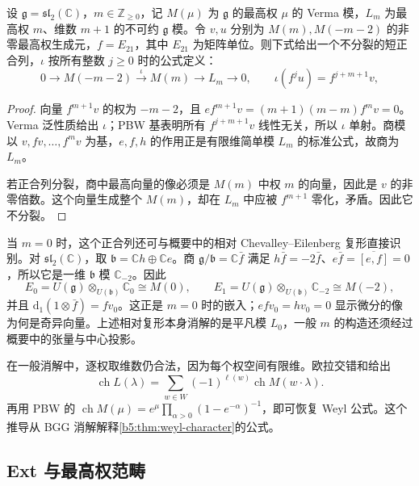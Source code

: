 \begin{proposition}\label{b5:prop:bgg-sl2-explicit}
	设 \(\mathfrak g=\mathfrak{sl}_2(\mathbb C)\)，\(m\in\mathbb Z_{\ge0}\)，记 \(M(\mu)\) 为 \(\mathfrak g\) 的最高权 \(\mu\) 的 Verma 模，\(L_m\) 为最高权 \(m\)、维数 \(m+1\) 的不可约 \(\mathfrak g\) 模。令 \(v,u\) 分别为 \(M(m),M(-m-2)\) 的非零最高权生成元，\(f=E_{21}\)，其中 \(E_{21}\) 为矩阵单位。则下式给出一个不分裂的短正合列，\(\iota\) 按所有整数 \(j\ge0\) 时的公式定义：
	\[
		0\longrightarrow M(-m-2)\overset{\iota}{\longrightarrow} M(m)\longrightarrow L_m\longrightarrow0, \qquad \iota(f^ju)=f^{j+m+1}v,
	\]
\end{proposition}
\begin{proof}
	向量 \(f^{m+1}v\) 的权为 \(-m-2\)，且 \(ef^{m+1}v=(m+1)(m-m)f^mv=0\)。Verma 泛性质给出 \(\iota\)；PBW 基表明所有 \(f^{j+m+1}v\) 线性无关，所以 \(\iota\) 单射。商模以 \(v,fv,\ldots,f^mv\) 为基，\(e,f,h\) 的作用正是有限维简单模 \(L_m\) 的标准公式，故商为 \(L_m\)。

	若正合列分裂，商中最高向量的像必须是 \(M(m)\) 中权 \(m\) 的向量，因此是 \(v\) 的非零倍数。这个向量生成整个 \(M(m)\)，却在 \(L_m\) 中应被 \(f^{m+1}\) 零化，矛盾。因此它不分裂。
\end{proof}

当 \(m=0\) 时，这个正合列还可与概要中的相对 Chevalley--Eilenberg 复形直接识别。对 \(\mathfrak{sl}_2(\mathbb C)\)，取 \(\mathfrak b=\mathbb Ch\oplus\mathbb Ce\)。商 \(\mathfrak g/\mathfrak b=\mathbb C\bar f\) 满足 \(h\bar f=-2\bar f\)、\(e\bar f=\overline{[e,f]}=0\)，所以它是一维 \(\mathfrak b\) 模 \(\mathbb C_{-2}\)。因此
\[
	E_0=U(\mathfrak g)\otimes_{U(\mathfrak b)}\mathbb C_0\cong M(0), \qquad E_1=U(\mathfrak g)\otimes_{U(\mathfrak b)}\mathbb C_{-2}\cong M(-2),
\]
并且 \(\mathrm{d}_1(1\otimes\bar f)=fv_0\)。这正是 \(m=0\) 时的嵌入；\(efv_0=hv_0=0\) 显示微分的像为何是奇异向量。上述相对复形本身消解的是平凡模 \(L_0\)，一般 \(m\) 的构造还须经过概要中的张量与中心投影。

\ProseParagraphBreak

在一般消解中，逐权取维数仍合法，因为每个权空间有限维。欧拉交错和给出
\[
	\operatorname{ch}L(\lambda) =\sum_{w\in W}(-1)^{\ell(w)}\operatorname{ch}M(w\mathbin{\cdot}\lambda).
\]
再用 PBW 的 \(\operatorname{ch}M(\mu)=e^\mu\prod_{\alpha>0}(1-e^{-\alpha})^{-1}\)，即可恢复 Weyl 公式。这个推导从 BGG 消解解释\cref{b5:thm:weyl-character}的公式。

\subsection{Ext 与最高权范畴}
\label{b5:subsec:2004:02}

